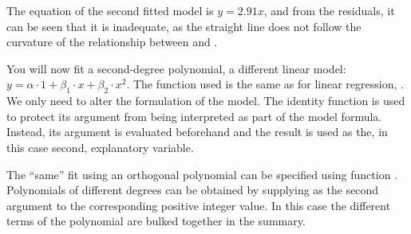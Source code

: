 \documentclass[krantz2]{krantz}\usepackage{knitr}
\begin{document}
The equation of the second fitted model is $y = 2.91 x$, and from the residuals, it can be seen that it is inadequate, as the straight line does not follow the curvature of the relationship between  and .
\begin{playground}
You will now fit a second-degree polynomial, a different linear model: $y = \alpha \cdot 1 + \beta_1 \cdot x + \beta_2 \cdot x^2$. The function used is the same as for linear regression, . We only need to alter the formulation of the model. The identity function  is used to protect its argument from being interpreted as part of the model formula. Instead, its argument is evaluated beforehand and the result is used as the, in this case second, explanatory variable.

\begin{knitrout}\footnotesize
{}\color{fgcolor}\begin{kframe}
\begin{alltt}
 \hlkwb{<-}  \hlopt{~}  \hlopt{+} \hlopt{^}\hlstd{),}  
  \hlstd{=} \hlstd{)}
\end{alltt}
\end{kframe}
\end{knitrout}

The ``same'' fit using an orthogonal polynomial can be specified using function . Polynomials of different degrees can be obtained by supplying as the second argument to  the corresponding positive integer value. In this case the different terms of the polynomial are bulked together in the summary.

\begin{knitrout}\footnotesize
{}\color{fgcolor}\begin{kframe}
\begin{alltt}
 \hlkwb{<-}  \hlopt{~}  \hlstd{),}  
\end{alltt}
\end{kframe}
\end{knitrout}


\end{playground}
\end{document}
